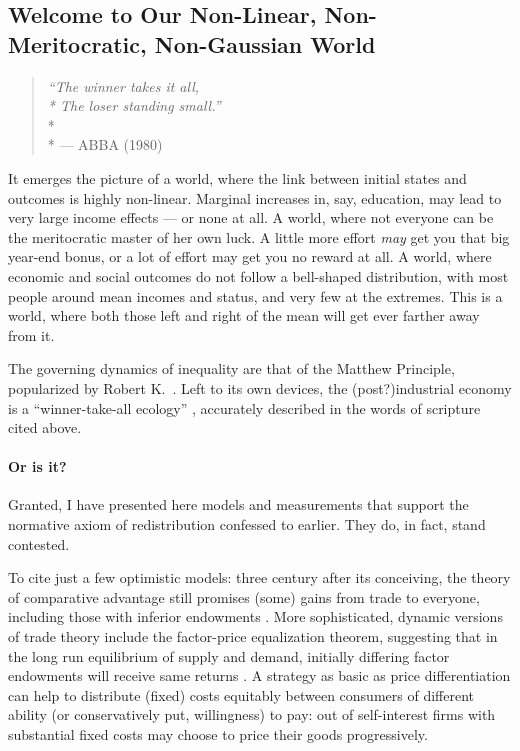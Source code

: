 \subsection[Our Non-Linear/Meritocratic/Gaussian World]{Welcome to Our Non-Linear, Non-Meritocratic, Non-Gaussian World}

\begin{quote}
	\emph{``The winner takes it all,\\*
	The loser standing small.''}\\*\\*
	--- ABBA (1980)
\end{quote}

It emerges the picture of a world, where the link between initial states and outcomes is highly non-linear.
Marginal increases in, say, education, may lead to very large income effects --- or none at all.
A world, where not everyone can be the meritocratic master of her own luck.
A little more effort \emph{may} get you that big year-end bonus, or a lot of effort may get you no reward at all.
A world, where economic and social outcomes do not follow a bell-shaped distribution, with most people around mean incomes and status, and very few at the extremes.
This is a world, where both those left and right of the mean will get ever farther away from it.

The governing dynamics of inequality are that of the Matthew Principle, popularized by Robert K.~\cite{Merton1988, Jackson1968}.
Left to its own devices, the (post?)industrial economy is a ``winner-take-all ecology'' \citep{Taleb2007}, accurately described in the words of scripture cited above.

\paragraph{Or is it?} Granted, I have presented here models and measurements that support the normative axiom of redistribution confessed to earlier.
They do, in fact, stand contested.

To cite just a few optimistic models:
three century after its conceiving, the theory of comparative advantage still promises (some) gains from trade to everyone, including those with inferior endowments \citep{Ricardo1817}.
More sophisticated, dynamic versions of trade theory include the factor-price equalization theorem, suggesting that in the long run equilibrium of supply and demand, initially differing factor endowments will receive same returns \citep{Stolper1941}.
A strategy as basic as price differentiation can help to distribute (fixed) costs equitably between consumers of different ability (or conservatively put, willingness) to pay:
out of self-interest firms with substantial fixed costs may choose to price their goods progressively.

